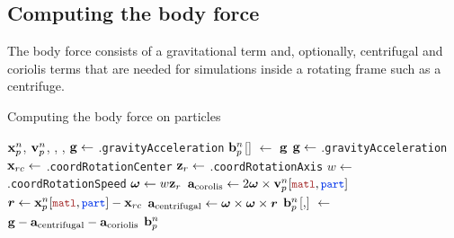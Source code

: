 \subsection{Computing the body force}
The body force consists of a gravitational term and, optionally, centrifugal and coriolis terms
that are needed for simulations inside a rotating frame such as a centrifuge.
\begin{breakablealgorithm}
  \caption{Computing the body force on particles}
  \begin{algorithmic}[1]
    \Require $\mathbf{x}_p^n$, $\mathbf{v}_p^n$, , , 
           \State $\mathbf{g} \leftarrow$ .\texttt{gravityAcceleration}
           \State $\mathbf{b}_p^{n}$[\TTmatl] $\leftarrow$ $\mathbf{g}$
        \Else
             \State $\mathbf{g} \leftarrow$ .\texttt{gravityAcceleration}
             \State $\mathbf{x}_{rc} \leftarrow$ .\texttt{coordRotationCenter}
             \State $\mathbf{z}_r \leftarrow$ .\texttt{coordRotationAxis}
             \State $w \leftarrow$ .\texttt{coordRotationSpeed}
             \State $\boldsymbol{\omega} \leftarrow w\mathbf{z}_r$
             \State $\Ba_{\text{corolis}} \leftarrow 2 \Bomega \times \Bv_p^{n}[\TTmatl,\TTpart]$
             \State $\Br \leftarrow \Bx_p^{n}[\TTmatl,\TTpart] - \Bx_{rc}$
             \State $\mathbf{a}_{\text{centrifugal}} \leftarrow \boldsymbol{\omega} \times \boldsymbol{\omega} \times \boldsymbol{r}$
             \State $\mathbf{b}_p^{n}$[\TTmatl,\TTpart] $\leftarrow$ 
                $\mathbf{g} -\mathbf{a}_{\text{centrifugal}} - \mathbf{a}_{\text{coriolis}}$
          \EndFor
        \EndIf
      \EndFor
      \State \Return $\mathbf{b}_p^{n}$
    \EndProcedure
  \end{algorithmic}
\end{breakablealgorithm}

